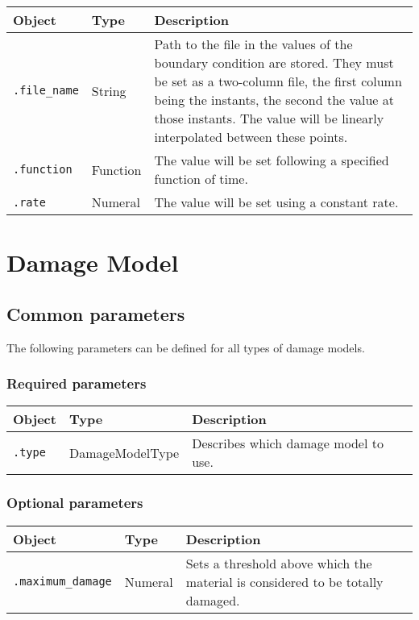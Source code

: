\documentclass[10pt]{article}
\begin{document}
\begin{tabularx}{\textwidth}{llX}
\hline 
Object & Type & Description \\ 
\hline 
\verb+.file_name+ & String & Path to the file in the values of the boundary condition are stored. They must be set as a two-column file, the first column being the instants, the second the value at those instants. The value will be linearly interpolated between these points.\\ 
\verb+.function+ & Function & The value will be set following a specified function of time. \\ 
\verb+.rate+ & Numeral & The value will be set using a constant rate. \\ 
\hline 
\end{tabularx}

\section{Damage Model}

\subsection{Common parameters}

The following parameters can be defined for all types of damage models.

\subsubsection*{Required parameters}

\begin{tabularx}{\textwidth}{llX}
\hline 
Object & Type & Description \\ 
\hline 
\verb+.type+ & DamageModelType & Describes which damage model to use. \\ 
\hline 
\end{tabularx}

\subsubsection*{Optional parameters}

\begin{tabularx}{\textwidth}{llX}
\hline 
Object & Type & Description \\ 
\hline 
\verb+.maximum_damage+ & Numeral & Sets a threshold above which the material is considered to be totally damaged. \\ 
\hline 
\end{tabularx}
\end{document}
